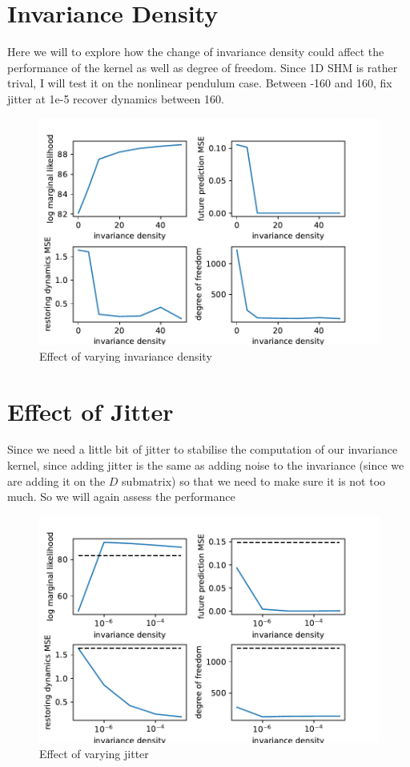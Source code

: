 \documentclass{statsmsc}
\begin{document}
\section{Invariance Density}
Here we will to explore how the change of invariance density could affect the performance of the kernel as well as degree of freedom.
Since 1D SHM is rather trival, I will test it on the nonlinear pendulum case. 
Between -160 and 160, fix jitter at 1e-5
recover dynamics between 160.

\begin{figure}[H] 
  \includegraphics[width=0.6\linewidth]{../codes/figures/vary_invariance_density.pdf}
  \centering
  \caption{Effect of varying invariance density}
  \label{fig:vary_invariance_density}
\end{figure}

\section{Effect of Jitter}
Since we need a little bit of jitter to stabilise the computation of our invariance kernel, since adding jitter is the same as adding noise to the invariance (since we are adding it on the $D$ submatrix) so that we need to make sure it is not too much. So we will again assess the performance 

\begin{figure}[H] 
  \includegraphics[width=0.6\linewidth]{../codes/figures/vary_jitter_density.pdf}
  \centering
  \caption{Effect of varying jitter}
  \label{fig:vary_jitter}
\end{figure}
\end{document}
